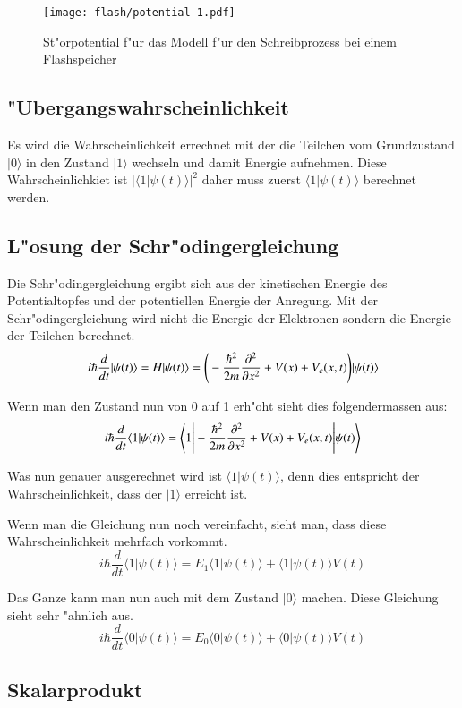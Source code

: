 \begin{refsection}
\begin{figure}
\centering
\texttt{[image: flash/potential-1.pdf]}
\caption{St"orpotential f"ur das Modell f"ur den Schreibprozess bei
einem Flashspeicher
\label{flash:Anregung}}
\end{figure}

\subsection{"Ubergangswahrscheinlichkeit}
Es wird die Wahrscheinlichkeit errechnet mit der die Teilchen
vom Grundzustand $|0\rangle$ in den Zustand $|1\rangle$ wechseln
und damit Energie aufnehmen. 
Diese Wahrscheinlichkiet ist $\vert\langle1|\psi(t)\rangle\vert^2$
daher muss zuerst $\langle1|\psi(t)\rangle$ berechnet werden.

\subsection{L"osung der Schr"odingergleichung}
Die Schr"odingergleichung ergibt sich aus der kinetischen Energie des
Potentialtopfes und der potentiellen Energie der Anregung.
Mit der Schr"odingergleichung wird nicht die Energie der Elektronen
sondern die Energie der Teilchen berechnet.
\[
i\hbar\frac{d}{dt}|\psi(t)\rangle = H|\psi(t)\rangle = \Bigg{(}-\frac{\hbar^2}{2m} \frac{\partial^2}{\partial x^2}+V(x)+V_{e}(x,t)\Bigg{)}|\psi(t)\rangle
\]

Wenn man den Zustand nun von 0 auf 1 erh"oht sieht dies folgendermassen aus:
\[
i\hbar\frac{d}{dt}\langle1|\psi(t)\rangle = \Bigg{\langle}1\Bigg{|}-\frac{\hbar^2}{2m} \frac{\partial^2}{\partial x^2}+V(x)+V_{e}(x,t)\Bigg{|}\psi(t)\Bigg{\rangle}
\]

Was nun genauer ausgerechnet wird ist $\langle1|\psi(t)\rangle$, denn
dies entspricht der Wahrscheinlichkeit, dass der $|1\rangle$ erreicht ist.

Wenn man die Gleichung nun noch vereinfacht, sieht man, dass diese
Wahrscheinlichkeit mehrfach vorkommt.
\[
i\hbar\frac{d}{dt}\langle1|\psi(t)\rangle = E_{1}\langle1|\psi(t)\rangle+\langle1|\psi(t)\rangle V(t)
\]

Das Ganze kann man nun auch mit dem Zustand $|0\rangle$ machen. Diese
Gleichung sieht sehr "ahnlich aus.
\[
i\hbar\frac{d}{dt}\langle0|\psi(t)\rangle = E_{0}\langle0|\psi(t)\rangle+\langle0|\psi(t)\rangle V(t)
\]

\subsection{Skalarprodukt}


\end{refsection}
